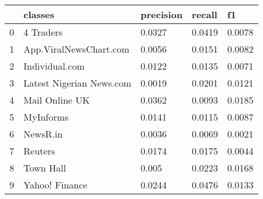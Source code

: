 \begin{tabular}{lllll}
\toprule
{} &                   classes & precision &  recall &      f1 \\
\midrule
0 &                 4 Traders &    0.0327 &  0.0419 &  0.0078 \\
1 &    App.ViralNewsChart.com &    0.0056 &  0.0151 &  0.0082 \\
2 &            Individual.com &    0.0122 &  0.0135 &  0.0071 \\
3 &  Latest Nigerian News.com &    0.0019 &  0.0201 &  0.0121 \\
4 &            Mail Online UK &    0.0362 &  0.0093 &  0.0185 \\
5 &                 MyInforms &    0.0141 &  0.0115 &  0.0087 \\
6 &                  NewsR.in &    0.0036 &  0.0069 &  0.0021 \\
7 &                   Reuters &    0.0174 &  0.0175 &  0.0044 \\
8 &                 Town Hall &     0.005 &  0.0223 &  0.0168 \\
9 &            Yahoo! Finance &    0.0244 &  0.0476 &  0.0133 \\
\bottomrule
\end{tabular}
